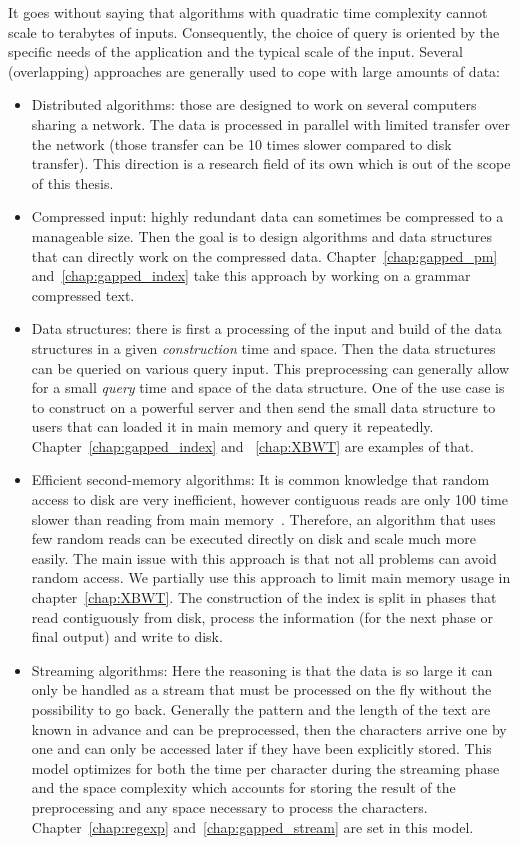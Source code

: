 It goes without saying that algorithms with quadratic time complexity cannot scale to terabytes of inputs. Consequently, the choice of query is oriented by the specific needs of the application and the typical scale of the input.
%
%
Several (overlapping) approaches are generally used to cope with large amounts of data:
\begin{itemize}
\item Distributed algorithms: those are designed to work on several computers sharing a network. The data is processed in parallel with limited transfer over the network (those transfer can be 10 times slower compared to disk transfer). This direction is a research field of its own which is out of the scope of this thesis.
\item Compressed input: highly redundant data can sometimes be compressed to a manageable size. Then the goal is to design algorithms and data structures that can directly work on the compressed data. Chapter~\ref{chap:gapped_pm} and~\ref{chap:gapped_index} take this approach by working on a grammar compressed text.
\item Data structures: there is first a processing of the input and build of the data structures in a given \emph{construction} time and space. Then the data structures can be queried on various query input. This preprocessing can generally allow for a small \emph{query} time and space of the data structure. One of the use case is to construct on a powerful server and then send the small data structure to users that can loaded it in main memory and query it repeatedly. Chapter~\ref{chap:gapped_index} and ~\ref{chap:XBWT} are examples of that.
\item Efficient second-memory algorithms: It is  common knowledge that random access to disk are very inefficient, however contiguous reads are only 100 time slower than reading from main memory~\cite{navarro2016compact}. Therefore, an algorithm that uses few random reads can be executed directly on disk and scale much more easily. The main issue with this approach is that not all problems can avoid random access. We partially use this approach to limit main memory usage in chapter~\ref{chap:XBWT}. The construction of the index is split in phases that read contiguously from disk, process the information (for the next phase or final output) and write to disk.
\item Streaming algorithms: Here the reasoning is that the data is so large it can only be handled as a stream that must be processed on the fly without the possibility to go back. Generally the pattern and the length of the text are known in advance and can be preprocessed, then the characters arrive one by one and can only be accessed later if they have been explicitly stored. This model optimizes for both the time per character during the streaming phase and the space complexity which accounts for storing the result of the preprocessing and any space necessary to process the characters. Chapter~\ref{chap:regexp} and~\ref{chap:gapped_stream} are set in this model.

\end{itemize}
